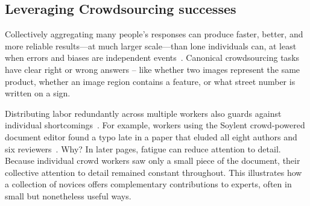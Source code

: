 

\subsection{Leveraging Crowdsourcing successes}
Collectively aggregating many people’s responses can produce faster, better, and more reliable results---at much larger scale---than lone individuals can, at least when errors and biases are independent events~\cite{Surowiecki2005}. Canonical crowdsourcing tasks have clear right or wrong answers – like whether two images represent the same product, whether an image region contains a feature, or what street number is written on a sign.

Distributing labor redundantly across multiple workers also guards against individual shortcomings~\cite{Snow2008}. For example, workers using the Soylent crowd-powered document editor found a typo late in a paper that eluded all eight authors and six reviewers~\cite{Bernstein2010a}. Why? In later pages, fatigue can reduce attention to detail. Because individual crowd workers saw only a small piece of the document, their collective attention to detail remained constant throughout. This illustrates how a collection of novices offers complementary contributions to experts, often in small but nonetheless useful ways. 

